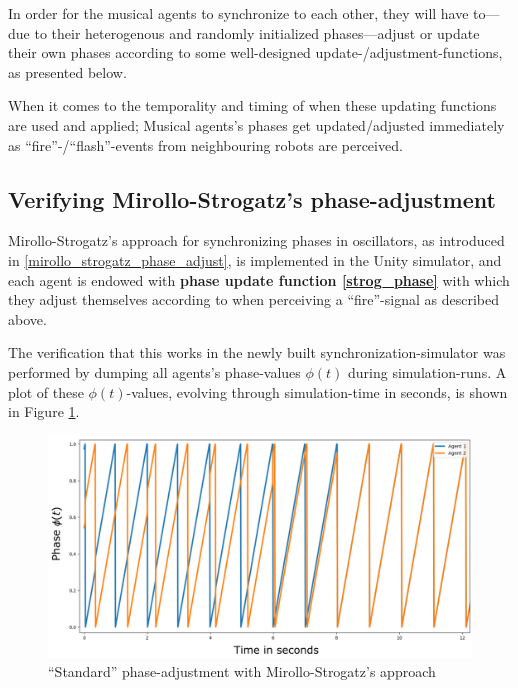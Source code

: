 	In order for the musical agents to synchronize to each other, they will have to—due to their heterogenous and randomly initialized phases—adjust or update their own phases according to some well-designed update-/adjustment-functions, as presented below.
	
	When it comes to the temporality and timing of when these updating functions are used and applied; Musical agents's phases get updated/adjusted immediately as ``fire''-/``flash''-events from neighbouring robots are perceived.
	
	
	
	\subsection{Verifying Mirollo-Strogatz's phase-adjustment} %
	
	Mirollo-Strogatz's approach for synchronizing phases in oscillators, as introduced in \ref{mirollo_strogatz_phase_adjust}, is implemented in the Unity simulator, and each agent is endowed with \textbf{phase update function \eqref{strog_phase}} with which they adjust themselves according to when perceiving a ``fire''-signal as described above.
	
	The verification that this works in the newly built synchronization-simulator was performed by dumping all agents's phase-values $\phi(t)$ during simulation-runs. A plot of these $\phi(t)$-values, evolving through simulation-time in seconds, is shown in Figure \ref{fig:strog_phase}.
	
	\begin{figure}[h]
		\centering
		\includegraphics[width=0.9\linewidth]{Assets/Figures/MirolloStrogatzPhaseAdjustmentSecondTry.pdf}
		\caption[Illustration of Mirollo-Strogatz's ``standard'' phase-adjustment]{``Standard'' phase-adjustment with Mirollo-Strogatz's approach}
		\label{fig:strog_phase}
	\end{figure}
	
